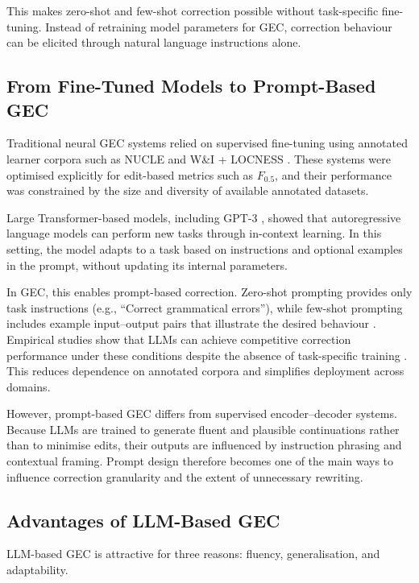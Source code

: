 This makes zero-shot and few-shot correction possible without task-specific fine-tuning. Instead of retraining model parameters for GEC, correction behaviour can be elicited through natural language instructions alone.

\subsection{From Fine-Tuned Models to Prompt-Based GEC}

Traditional neural GEC systems relied on supervised fine-tuning using annotated learner corpora such as NUCLE and W\&I + LOCNESS \cite{ng-etal-2014-conll,bryant-etal-2019-bea}. These systems were optimised explicitly for edit-based metrics such as $F_{0.5}$, and their performance was constrained by the size and diversity of available annotated datasets.

Large Transformer-based models, including GPT-3 \cite{NEURIPS2020_1457c0d6}, showed that autoregressive language models can perform new tasks through in-context learning. In this setting, the model adapts to a task based on instructions and optional examples in the prompt, without updating its internal parameters.

In GEC, this enables prompt-based correction. Zero-shot prompting provides only task instructions (e.g., ``Correct grammatical errors''), while few-shot prompting includes example input--output pairs that illustrate the desired behaviour \cite{NEURIPS2020_1457c0d6}. Empirical studies show that LLMs can achieve competitive correction performance under these conditions despite the absence of task-specific training \cite{loem2023exploringeffectivenessgpt3grammatical}. This reduces dependence on annotated corpora and simplifies deployment across domains.

However, prompt-based GEC differs from supervised encoder--decoder systems. Because LLMs are trained to generate fluent and plausible continuations rather than to minimise edits, their outputs are influenced by instruction phrasing and contextual framing. Prompt design therefore becomes one of the main ways to influence correction granularity and the extent of unnecessary rewriting.

\subsection{Advantages of LLM-Based GEC}

LLM-based GEC is attractive for three reasons: fluency, generalisation, and adaptability.

